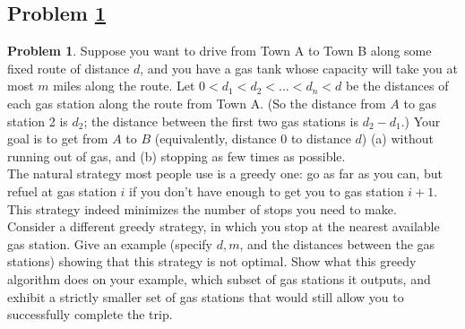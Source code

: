 \documentclass[11pt]{article}
\theoremstyle{definition}
\theoremstyle{definition}
\newtheorem{required}{Problem}
\theoremstyle{definition}
\begin{document}
\subsection{Problem \ref{DFS1}}
\begin{required} \label{DFS1}
Suppose you want to drive from Town A to Town B along some fixed route of distance $d$, and you have a gas tank whose capacity will take you at most $m$ miles along the route. Let $0 < d_1 < d_2 < ... < d_n < d$ be the distances of each gas station along the route from Town A. (So the distance from $A$ to gas station 2 is $d_2$; the distance between the first two gas stations is $d_2 - d_1$.) Your goal is to get from $A$ to $B$ (equivalently, distance $0$ to distance $d$) (a) without running out of gas, and (b) stopping as few times as possible. \\
    
\noindent The natural strategy most people use is a greedy one: go as far as you can, but refuel at gas station $i$ if you don't have enough to get you to gas station $i+1$. This strategy indeed minimizes the number of stops you need to make.  \\

\noindent Consider a different greedy strategy, in which you stop at the nearest available gas station. Give an example (specify $d, m$, and the distances between the gas stations) showing that this strategy is not optimal. Show what this greedy algorithm does on your example, which subset of gas stations it outputs, and exhibit a strictly smaller set of gas stations that would still allow you to successfully complete the trip.
\end{required}
\end{document}
